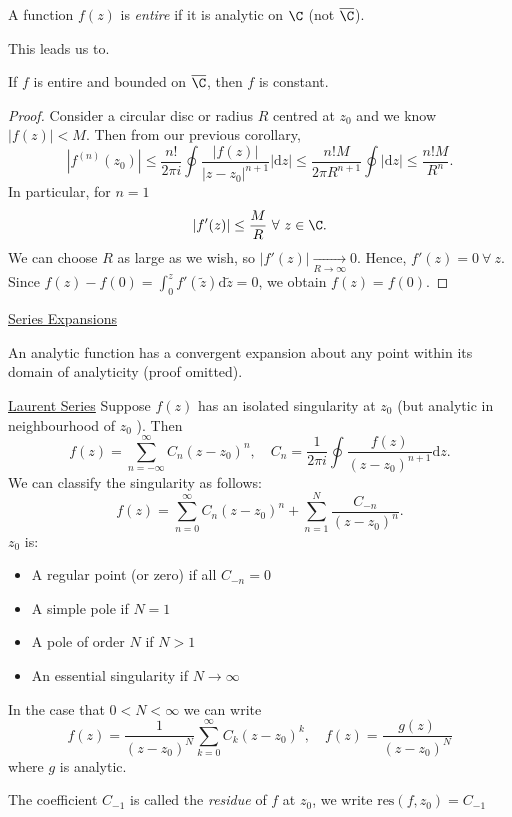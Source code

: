 \documentclass[a4paper]{article}
\begin{document}
\begin{defi}[Entire]
    A function $f(z)$ is \emph{entire} if it is analytic on $\C$ (not $\overline{\C}$).
\end{defi}
This leads us to.
\begin{thm}
    If $f$ is entire and bounded on $\overline{\C}$, then  $f$ is constant.
\end{thm}
\begin{proof}
    Consider a circular disc or radius $R$ centred at $z_0$ and we know $|f(z)| < M$. Then from our previous corollary, 
     \[
         |f^{(n)}(z_0)| \le \frac{n!}{ 2 \pi i} \oint \frac{| f(z)| }{ | z - z_0|^{n + 1}} |\text{d}z| \le \frac{n! M}{2 \pi R^{n + 1}} \oint |\text{d}z| \le \frac{n! M}{R^{n}}
    .\] 
    In particular, for $n = 1$ 
     \[
         |f'(z)| \le \frac{M}{R} \ \forall \  z \in  \C
    .\] 
    We can choose $R$ as large as we wish, so $|f'(z)| \underset{ R \to \infty}{\to} 0$. Hence, $f' (z) = 0 \ \forall \  z$. Since $f(z) - f(0) = \int_{0}^{z} f' (\tilde{z}) \text{d}\tilde{z} = 0$, we obtain $f(z) = f(0).$
\end{proof}
\underline{Series Expansions}
\begin{thm}
    An analytic function has a convergent expansion about any point within its domain of analyticity (proof omitted).
\end{thm}
\underline{Laurent Series}
Suppose $f(z) $ has an isolated singularity at $z_0 $ (but analytic in neighbourhood of $z_0$ ). Then 
\[
    f(z) = \sum_{n = - \infty}^{\infty} C_n (z - z_0)^{n}, \quad C_n = \frac{1}{2 \pi i} \oint \frac{f(z)}{ (z - z_0)^{n + 1}} \text{d}z
.\] 
We can classify the singularity as follows: 
\[
    f(z) = \sum_{n = 0}^{\infty} C_n ( z - z_0)^{n} + \sum^{N}_{n = 1} \frac{C_{-n}}{ (z - z_0)^{n}}
.\] 
$z_0$ is:
\begin{itemize}
    \item A regular point (or zero) if all $C_{-n } = 0$
    \item A simple pole if $N = 1$ 
    \item A pole of order $N$ if $N > 1$
    \item An essential singularity if  $N \to \infty$
\end{itemize}
In the case that $0 < N < \infty$ we can write
\[
    f(z) = \frac{1}{(z - z_0)^{N}} \sum_{ k = 0 }^{\infty} C_k (z - z_0)^{k}, \quad f(z) = \frac{g(z)}{(z - z_0)^{N}} 
\]
where $g$ is analytic. 
 \begin{defi}[Residue]
     The coefficient  $C_{-1}$ is called the \emph{residue} of $f$ at $z_0$, we write $\text{res}(f, z_0) = C_{-1}$
\end{defi}
\end{document}
